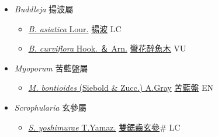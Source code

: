 
  \begin{itemize}
 \item[] \textit{Buddleja} 揚波屬
                    
  \begin{itemize}
        \item[] \href{http://www.theplantlist.org/tpl1.1/search?q=Buddleja+asiatica}{\textit{B. asiatica} Lour.}   \href{\detokenize{http://taibnet.sinica.edu.tw/chi/taibnet_species_list.php?T2=揚波&T2_new_value=true&fr=y}}{揚波} LC
        \item[] \href{http://www.theplantlist.org/tpl1.1/search?q=Buddleja+curviflora}{\textit{B. curviflora} Hook. ＆ Arn.}   \href{\detokenize{http://taibnet.sinica.edu.tw/chi/taibnet_species_list.php?T2=彎花醉魚木&T2_new_value=true&fr=y}}{彎花醉魚木} VU
  \end{itemize}
 \item[] \textit{Myoporum} 苦藍盤屬
                    
  \begin{itemize}
        \item[] \href{http://www.theplantlist.org/tpl1.1/search?q=Myoporum+bontioides}{\textit{M. bontioides} (Siebold \& Zucc.) A.Gray}   \href{\detokenize{http://taibnet.sinica.edu.tw/chi/taibnet_species_list.php?T2=苦藍盤&T2_new_value=true&fr=y}}{苦藍盤} EN
  \end{itemize}
 \item[] \textit{Scrophularia} 玄參屬
                    
  \begin{itemize}
        \item[] \href{http://www.theplantlist.org/tpl1.1/search?q=Scrophularia+yoshimurae}{\textit{S. yoshimurae} T.Yamaz.}   \href{\detokenize{http://taibnet.sinica.edu.tw/chi/taibnet_species_list.php?T2=雙鋸齒玄參&T2_new_value=true&fr=y}}{雙鋸齒玄參}\# LC
  \end{itemize}
  \end{itemize}
